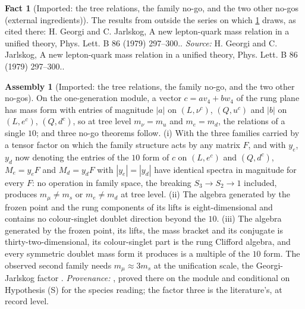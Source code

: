 \documentclass[11pt]{article}
\theoremstyle{definition}
\newtheorem{fact}[theorem]{Fact}
\newtheorem{assembled}[theorem]{Assembly}
\theoremstyle{plain}
\newcommand{\changedmark}[2]{\marginpar{\raggedright\scriptsize\color{#1}#2}}
\begin{document}
\begin{fact}[Imported: the tree relations, the family no-go, and the two other no-gos (external ingredients)]\label{c:families.imported-tree-relations-family-no-go-external}
The results from outside the series on which \ref{c:families.imported-tree-relations-family-no-go} draws, as cited there: H. Georgi and C. Jarlskog, A new lepton-quark mass relation in a unified theory, Phys. Lett. B 86 (1979) 297--300..
\emph{Source:} H. Georgi and C. Jarlskog, A new lepton-quark mass relation in a unified theory, Phys. Lett. B 86 (1979) 297--300..
\end{fact}

\begin{assembled}[Imported: the tree relations, the family no-go, and the two other no-gos]\label{c:families.imported-tree-relations-family-no-go}
\changedmark{gray}{reworded}
On the one-generation module, a vector $c = a v_{4} + b w_{4}$ of the rung plane has mass form with entries of magnitude $|a|$ on $(L, \nu^{c})$, $(Q, u^{c})$ and $|b|$ on $(L, e^{c})$, $(Q, d^{c})$, so at tree level $m_{\nu} = m_{u}$ and $m_{e} = m_{d}$, the relations of a single $10$; and three no-go theorems follow. (i) With the three families carried by a tensor factor on which the family structure acts by any matrix $F$, and with $y_{e}$, $y_{d}$ now denoting the entries of the $10$ form of $c$ on $(L, e^{c})$ and $(Q, d^{c})$, $M_{e} = y_{e}F$ and $M_{d} = y_{d}F$ with $|y_{e}| = |y_{d}|$ have identical spectra in magnitude for every $F$: no operation in family space, the breaking $S_{3} \to S_{2} \to 1$ included, produces $m_{\mu} \neq m_{s}$ or $m_{e} \neq m_{d}$ at tree level. (ii) The algebra generated by the frozen point and the rung components of its lifts is eight-dimensional and contains no colour-singlet doublet direction beyond the $10$. (iii) The algebra generated by the frozen point, its lifts, the mass bracket and its conjugate is thirty-two-dimensional, its colour-singlet part is the rung Clifford algebra, and every symmetric doublet mass form it produces is a multiple of the $10$ form. The observed second family needs $m_{\mu} \approx 3 m_{s}$ at the unification scale, the Georgi-Jarlskog factor \cite{GeorgiJarlskog1979}. \emph{Provenance:} \cite[Cor.~9.25, Thms.~9.31, 9.33, 9.35]{ButlerT12}, proved there on the module and conditional on Hypothesis (S) for the species reading; the factor three is the literature's, at record level.
\end{assembled}
\end{document}
